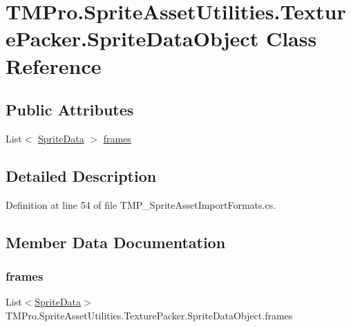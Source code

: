 \hypertarget{class_t_m_pro_1_1_sprite_asset_utilities_1_1_texture_packer_1_1_sprite_data_object}{}\section{T\+M\+Pro.\+Sprite\+Asset\+Utilities.\+Texture\+Packer.\+Sprite\+Data\+Object Class Reference}
\label{class_t_m_pro_1_1_sprite_asset_utilities_1_1_texture_packer_1_1_sprite_data_object}
\subsection*{Public Attributes}
\begin{DoxyCompactItemize}
\item 
List$<$ \mbox{\hyperlink{struct_t_m_pro_1_1_sprite_asset_utilities_1_1_texture_packer_1_1_sprite_data}{Sprite\+Data}} $>$ \mbox{\hyperlink{class_t_m_pro_1_1_sprite_asset_utilities_1_1_texture_packer_1_1_sprite_data_object_a6d29bb4e6fe078b4e4a23b98fefd6cce}{frames}}
\end{DoxyCompactItemize}


\subsection{Detailed Description}


Definition at line 54 of file T\+M\+P\+\_\+\+Sprite\+Asset\+Import\+Formats.\+cs.



\subsection{Member Data Documentation}
\mbox{\label{class_t_m_pro_1_1_sprite_asset_utilities_1_1_texture_packer_1_1_sprite_data_object_a6d29bb4e6fe078b4e4a23b98fefd6cce}} 
\subsubsection{\texorpdfstring{frames}{frames}}
{\footnotesize\ttfamily List$<$\mbox{\hyperlink{struct_t_m_pro_1_1_sprite_asset_utilities_1_1_texture_packer_1_1_sprite_data}{Sprite\+Data}}$>$ T\+M\+Pro.\+Sprite\+Asset\+Utilities.\+Texture\+Packer.\+Sprite\+Data\+Object.\+frames}




